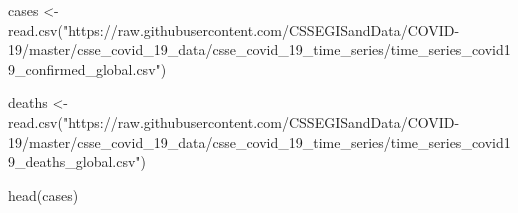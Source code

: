 \documentclass[
]{article}
\newenvironment{Shaded}{\begin{snugshade}}{\end{snugshade}}
\newcommand{\FunctionTok}[1]{\textcolor[rgb]{0.00,0.00,0.00}{#1}}
\newcommand{\NormalTok}[1]{#1}
\newcommand{\OtherTok}[1]{\textcolor[rgb]{0.56,0.35,0.01}{#1}}
\newcommand{\StringTok}[1]{\textcolor[rgb]{0.31,0.60,0.02}{#1}}
\begin{document}
\begin{Shaded}
\begin{Highlighting}[]
\NormalTok{cases }\OtherTok{\textless{}{-}} \FunctionTok{read.csv}\NormalTok{(}\StringTok{"https://raw.githubusercontent.com/CSSEGISandData/COVID{-}19/master/csse\_covid\_19\_data/csse\_covid\_19\_time\_series/time\_series\_covid19\_confirmed\_global.csv"}\NormalTok{)}

\NormalTok{deaths }\OtherTok{\textless{}{-}} \FunctionTok{read.csv}\NormalTok{(}\StringTok{"https://raw.githubusercontent.com/CSSEGISandData/COVID{-}19/master/csse\_covid\_19\_data/csse\_covid\_19\_time\_series/time\_series\_covid19\_deaths\_global.csv"}\NormalTok{)}

\FunctionTok{head}\NormalTok{(cases)}
\end{Highlighting}
\end{Shaded}
\end{document}

